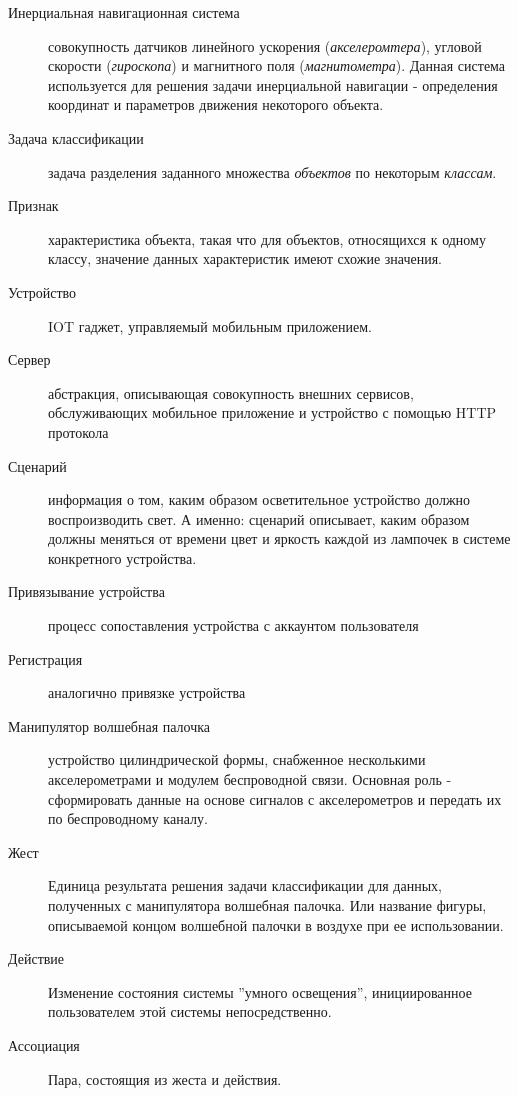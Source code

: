 \Defines %
\begin{description}
\item[Инерциальная навигационная система] совокупность датчиков линейного ускорения (\textit{акселеромтера}), угловой скорости (\textit{гироскопа}) и магнитного поля (\textit{магнитометра}).
Данная система используется для решения задачи инерциальной навигации - определения координат и параметров движения некоторого объекта.
\item[Задача классификации] задача разделения заданного множества \textit{объектов} по некоторым \textit{классам}.
\item[Признак] характеристика объекта, такая что для объектов, относящихся к одному классу, значение данных характеристик имеют схожие значения.
\item[Устройство] IOT гаджет, управляемый мобильным приложением.
\item[Сервер] абстракция, описывающая совокупность внешних сервисов, обслуживающих мобильное приложение и устройство с помощью HTTP протокола
\item[Сценарий] информация о том, каким образом осветительное устройство должно воспроизводить свет. А именно: сценарий описывает, каким образом должны меняться от времени цвет и яркость каждой из лампочек в системе конкретного устройства.
\item[Привязывание устройства] процесс сопоставления устройства с аккаунтом пользователя
\item[Регистрация] аналогично привязке устройства
\item[Манипулятор волшебная палочка] устройство цилиндрической формы, снабженное несколькими акселерометрами и модулем беспроводной связи. Основная роль - сформировать данные на основе сигналов с акселерометров и передать их по беспроводному каналу.
\item[Жест] Единица результата решения задачи классификации для данных, полученных с манипулятора волшебная палочка. Или название фигуры, описываемой концом волшебной палочки в воздухе при ее использовании.
\item[Действие] Изменение состояния системы ''умного освещения'', инициированное пользователем этой системы непосредственно.
\item[Ассоциация] Пара, состоящия из жеста и действия.

\end{description}

